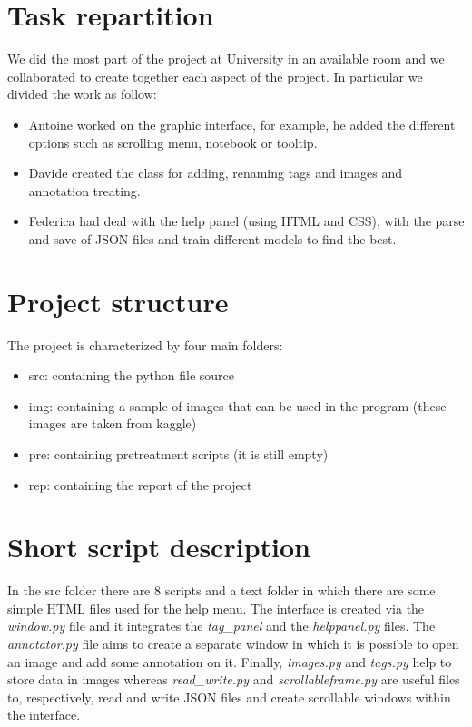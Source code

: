 \documentclass[a4paper, 11pt]{article}
\begin{document}
\section{Task repartition}
We did the most part of the project at University in an available room 
and we collaborated to create together each aspect of the project.
In particular we divided the work as follow:
\begin{itemize}
  \item Antoine worked on the graphic interface, for example, he added the different options such as scrolling menu, notebook or tooltip.
  \item Davide created the class for adding, renaming tags and images and annotation treating.
  \item Federica had deal with the help panel (using HTML and CSS), with the parse and save of JSON files and train different models to find the best. 
\end{itemize}


\section{Project structure}
The project is characterized by four main folders:
\begin{itemize}
  \item src: containing the python file source
  \item img: containing a sample of images that can be used in the program (these images are taken from kaggle)
  \item pre: containing pretreatment scripts (it is still empty)
  \item rep: containing the report of the project
\end{itemize}

\section{Short script description}
In the src folder there are 8 scripts and a text folder in which there are some simple HTML files used for the help menu.
The interface is created via the \textit{window.py} file and it integrates the \textit{tag\_panel} and the \textit{helppanel.py} files.
The \textit{annotator.py} file aims to create a separate window in which it is possible to open an image and add some annotation on it.
Finally, \textit{images.py} and \textit{tags.py} help to store data in images whereas \textit{read\_write.py} and \textit{scrollableframe.py} are useful files to, respectively, read and write JSON files and create scrollable windows within the interface.
\end{document}
